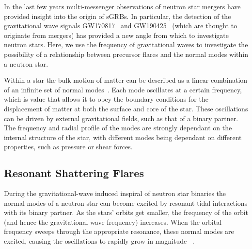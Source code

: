 \documentclass[fleqn,usenatbib]{mnras}
\begin{document}
\hspace{\parindent}In the last few years multi-messenger observations of neutron star mergers have provided insight into the origin of sGRBs. In particular, the detection of the gravitational wave signals GW170817~\citet{abbott2017merger} and GW190425~\citet{abbott2020gw190425} (which are thought to originate from mergers) has provided a new angle from which to investigate neutron stars. Here, we use the frequency of gravitational waves to investigate the possibility of a relationship between precursor flares and the normal modes within a neutron star.%

\hspace{\parindent}Within a star the bulk motion of matter can be described as a linear combination of an infinite set of normal modes~\citet{smeyers2011linear}. Each mode oscillates at a certain frequency, which is value that allows it to obey the boundary conditions for the displacement of matter at both the surface and core of the star. These oscillations can be driven by external gravitational fields, such as that of a binary partner. The frequency and radial profile of the modes are strongly dependant on the internal structure of the star, with different modes being dependant on different properties, such as pressure or shear forces.%







\subsection{Resonant Shattering Flares}
\hspace{\parindent}During the gravitational-wave induced inspiral of neutron star binaries the normal modes of a neutron star can become excited by resonant tidal interactions with its binary partner. 
As the stars' orbits get smaller, the frequency of the orbit (and hence the gravitational wave frequency) increases.
When the orbital frequency sweeps through the appropriate resonance, these normal modes are excited, causing the oscillations to rapidly grow in magnitude~\citep{tsang2012resonant, tsang2013shattering, lai1994resonant} .
\end{document}
